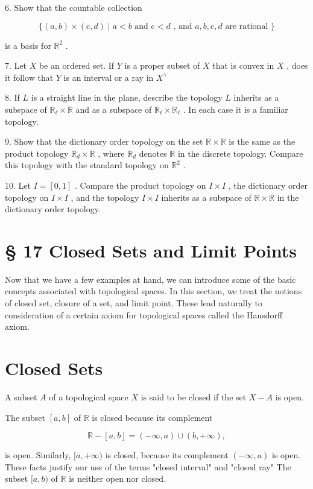 6. Show that the countable collection

\[
\{ \left( {a,b}\right)  \times  \left( {\mathrm{c},d}\right)  \mid  a < b\text{ and }\mathrm{c} < d\text{ , and }a,b,\mathrm{c},d\text{ are rational }\}
\]

is a basis for \({\mathbb{R}}^{2}\) .

7. Let \(X\) be an ordered set. If \(Y\) is a proper subset of \(X\) that is convex in \(X\) , does it follow that \(Y\) is an interval or a ray in \({X}^{\gamma }\)

8. If \(L\) is a straight line in the plane, describe the topology \(L\) inherits as a subspace of \({\mathbb{R}}_{\ell } \times  \mathbb{R}\) and as a subspace of \({\mathbb{R}}_{\ell } \times  {\mathbb{R}}_{\ell }\) . In each case it is a familiar topology.

9. Show that the dictionary order topology on the set \(\mathbb{R} \times  \mathbb{R}\) is the same as the product topology \({\mathbb{R}}_{d} \times  \mathbb{R}\) , where \({\mathbb{R}}_{d}\) denotes \(\mathbb{R}\) in the discrete topology. Compare this topology with the standard topology on \({\mathbb{R}}^{2}\) .

10. Let \(I = \left\lbrack  {0,1}\right\rbrack\) . Compare the product topology on \(I \times  I\) , the dictionary order topology on \(I \times  I\) , and the topology \(I \times  I\) inherits as a subspace of \(\mathbb{R} \times  \mathbb{R}\) in the dictionary order topology.

\section*{§ 17 Closed Sets and Limit Points}

Now that we have a few examples at hand, we can introduce some of the basic concepts associated with topological spaces. In this section, we treat the notions of closed set, closure of a set, and limit point. These lead naturally to consideration of a certain axiom for topological spaces called the Hausdorff axiom.

\section*{Closed Sets}

A subset \(A\) of a topological space \(X\) is said to be closed if the set \(X - A\) is open.

\begin{example} The subset \(\left\lbrack  {a,b}\right\rbrack\) of \(\mathbb{R}\) is closed because its complement

\[
\mathbb{R} - \left\lbrack  {a,b}\right\rbrack   = \left( {-\infty ,a}\right)  \cup  \left( {b, + \infty }\right) ,
\]

is open. Similarly, \(\lbrack a, + \infty )\) is closed, because its complement \(\left( {-\infty ,a}\right)\) is open. These facts justify our use of the terms "closed interval" and "closed ray" The subset \(\lbrack a,b)\) of \(\mathbb{R}\) is neither open nor closed.
\end{example}


